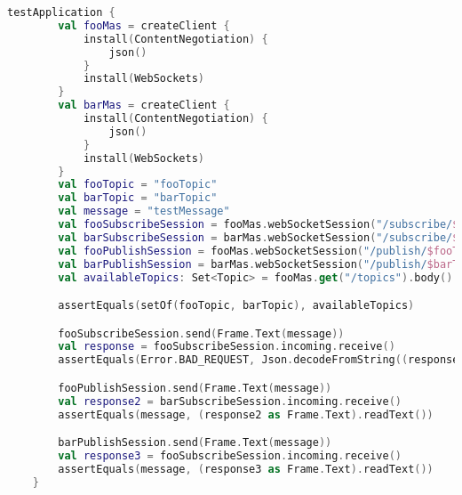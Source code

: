 \begin{lstlisting}[caption={Test class \texttt{BrokerBehaviorSpec}.}, label={lst:BrokerBehaviorSpec}, language=Kotlin]
    testApplication {
        val fooMas = createClient {
            install(ContentNegotiation) {
                json()
            }
            install(WebSockets)
        }
        val barMas = createClient {
            install(ContentNegotiation) {
                json()
            }
            install(WebSockets)
        }
        val fooTopic = "fooTopic"
        val barTopic = "barTopic"
        val message = "testMessage"
        val fooSubscribeSession = fooMas.webSocketSession("/subscribe/$barTopic")
        val barSubscribeSession = barMas.webSocketSession("/subscribe/$fooTopic")
        val fooPublishSession = fooMas.webSocketSession("/publish/$fooTopic")
        val barPublishSession = barMas.webSocketSession("/publish/$barTopic")
        val availableTopics: Set<Topic> = fooMas.get("/topics").body()

        assertEquals(setOf(fooTopic, barTopic), availableTopics)

        fooSubscribeSession.send(Frame.Text(message))
        val response = fooSubscribeSession.incoming.receive()
        assertEquals(Error.BAD_REQUEST, Json.decodeFromString((response as Frame.Text).readText()))

        fooPublishSession.send(Frame.Text(message))
        val response2 = barSubscribeSession.incoming.receive()
        assertEquals(message, (response2 as Frame.Text).readText())

        barPublishSession.send(Frame.Text(message))
        val response3 = fooSubscribeSession.incoming.receive()
        assertEquals(message, (response3 as Frame.Text).readText())
    }
\end{lstlisting}
